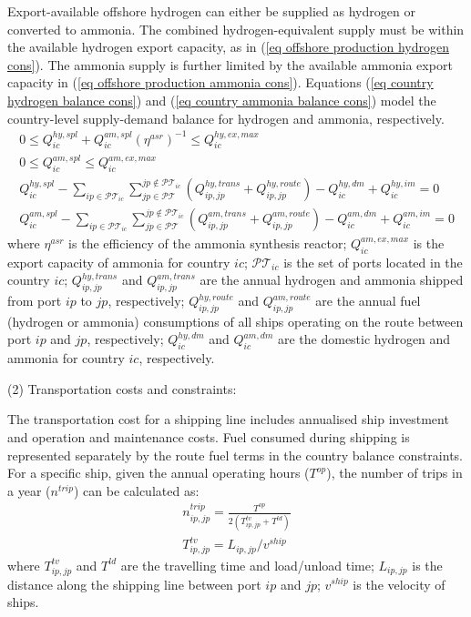 \documentclass[sn-mathphys,Numbered]{sn-jnl}%
\theoremstyle{plain}%
\theoremstyle{definition}%
\theoremstyle{remark}%
\begin{document}
Export-available offshore hydrogen can either be supplied as hydrogen or converted to ammonia. The combined hydrogen-equivalent supply must be within the available hydrogen export capacity, as in (\ref{eq offshore production hydrogen cons}). The ammonia supply is further limited by the available ammonia export capacity in (\ref{eq offshore production ammonia cons}). Equations (\ref{eq country hydrogen balance cons}) and (\ref{eq country ammonia balance cons}) model the country-level supply-demand balance for hydrogen and ammonia, respectively.
\begin{gather}
    0 \leq Q_{ic}^{hy,spl} + Q_{ic}^{am,spl} (\eta^{asr})^{-1} \leq Q_{ic}^{hy,ex,max}
\label{eq offshore production hydrogen cons}\\
    0 \leq Q_{ic}^{am,spl} \leq Q_{ic}^{am,ex,max}
\label{eq offshore production ammonia cons}\\
    Q_{ic}^{hy,spl} - \sum_{ip \in \mathcal{PT}_{ic}} \sum_{jp \in \mathcal{PT}}^{jp \notin \mathcal{PT}_{ic}} \left( Q_{ip,jp}^{hy,trans} + Q_{ip,jp}^{hy,route} \right) - Q_{ic}^{hy,dm} + Q_{ic}^{hy,im}= 0
\label{eq country hydrogen balance cons}\\
    Q_{ic}^{am,spl} - \sum_{ip \in \mathcal{PT}_{ic}} \sum_{jp \in \mathcal{PT}}^{jp \notin \mathcal{PT}_{ic}} \left( Q_{ip,jp}^{am,trans} + Q_{ip,jp}^{am,route} \right) - Q_{ic}^{am,dm} + Q_{ic}^{am,im}  = 0
\label{eq country ammonia balance cons}
\end{gather}
where $\eta^{asr}$ is the efficiency of the ammonia synthesis reactor; $Q_{ic}^{am,ex,max}$ is the export capacity of ammonia for country $ic$; $\mathcal{PT}_{ic}$ is the set of ports located in the country $ic$; $Q_{ip,jp}^{hy,trans}$ and $Q_{ip,jp}^{am,trans}$ are the annual hydrogen and ammonia shipped from port $ip$ to $jp$, respectively; $Q_{ip,jp}^{hy,route}$ and $Q_{ip,jp}^{am,route}$ are the annual fuel (hydrogen or ammonia) consumptions of all ships operating on the route between port $ip$ and $jp$, respectively; $Q_{ic}^{hy,dm}$ and $Q_{ic}^{am,dm}$ are the domestic hydrogen and ammonia for country $ic$, respectively.

(2) Transportation costs and constraints:

The transportation cost for a shipping line includes annualised ship investment and operation and maintenance costs. Fuel consumed during shipping is represented separately by the route fuel terms in the country balance constraints. For a specific ship, given the annual operating hours ($T^{op}$), the number of trips in a year ($n^{trip}$) can be calculated as:
\begin{gather}
    n_{ip,jp}^{trip} = \frac{T^{op}}{2(T_{ip,jp}^{tv} + T^{ld})}
\\
    T_{ip,jp}^{tv} = L_{ip,jp} / v^{ship}
\end{gather}
where $T_{ip,jp}^{tv}$ and $T^{ld}$ are the travelling time and load/unload time; $L_{ip,jp}$ is the distance along the shipping line between port $ip$ and $jp$; $v^{ship}$ is the velocity of ships.
\end{document}
